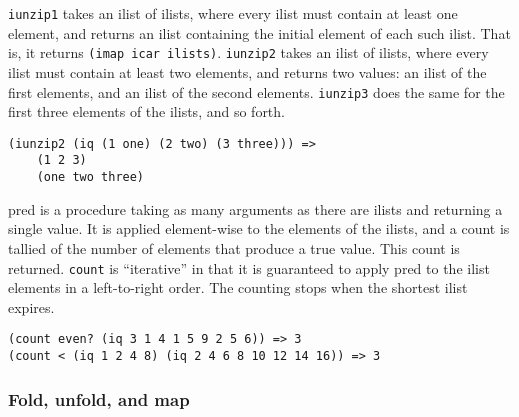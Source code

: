 \begin{entry}{%
  }

  \texttt{iunzip1}
  takes an ilist of ilists, where every ilist must contain at least
  one element, and returns an ilist containing the initial element of
  each such ilist. That is, it returns \texttt{(imap\ icar\
    ilists)}. \texttt{iunzip2} takes an ilist of ilists, where every
  ilist must contain at least two elements, and returns two values: an
  ilist of the first elements, and an ilist of the second
  elements. \texttt{iunzip3} does the same for the first three
  elements of the ilists, and so forth.

\begin{verbatim}
(iunzip2 (iq (1 one) (2 two) (3 three))) =>
    (1 2 3) 
    (one two three)
\end{verbatim}
\end{entry}

\begin{entry}{%
  }

  pred is a procedure taking as many
  arguments as there are ilists and returning a single value. It is
  applied element-wise to the elements of the ilists, and a count is
  tallied of the number of elements that produce a true value. This
  count is returned. \texttt{count} is ``iterative'' in that it is
  guaranteed to apply pred to the ilist elements in a left-to-right
  order. The counting stops when the shortest ilist expires.

\begin{verbatim}
(count even? (iq 3 1 4 1 5 9 2 5 6)) => 3
(count < (iq 1 2 4 8) (iq 2 4 6 8 10 12 14 16)) => 3
\end{verbatim}
\end{entry}

\subsubsection{{Fold, unfold, and  map}}

